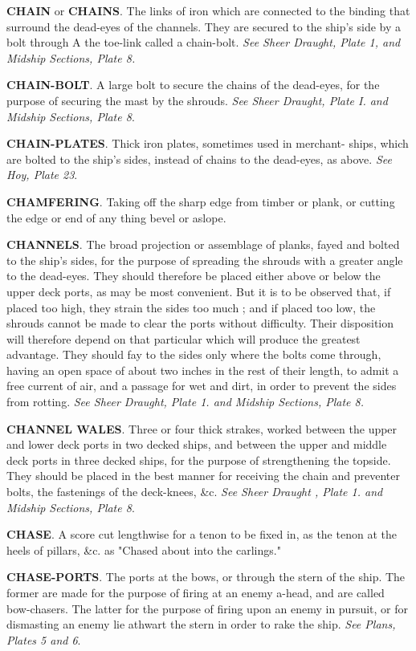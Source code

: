 \textbf{CHAIN} or \textbf{CHAINS}. The links of iron which are connected to the binding that surround the dead-eyes of the channels. They are secured to the ship's side by a bolt through A the toe-link called a chain-bolt. \textit{See Sheer Draught, Plate 1, and Midship Sections, Plate 8. }

\textbf{CHAIN-BOLT}. A large bolt to secure the chains of the dead-eyes, for the purpose of securing the mast by the shrouds. \textit{See Sheer Draught, Plate I. and Midship Sections, Plate 8}. 

\textbf{CHAIN-PLATES}. Thick iron plates, sometimes used in merchant- ships, which are bolted to the ship's sides, instead of chains to the dead-eyes, as above. \textit{See Hoy, Plate 23}. 

\textbf{CHAMFERING}. Taking off the sharp edge from timber or plank, or cutting the edge or end of any thing bevel or aslope. 

\textbf{CHANNELS}. The broad projection or assemblage of planks, fayed and bolted to the ship's sides, for the purpose of spreading the shrouds with a greater angle to the dead-eyes. They should therefore be placed either above or below the upper deck ports, as may be most convenient. But it is to be observed that, if placed too high, they strain the sides too much ; and if placed too low, the shrouds cannot be made to clear the ports without difficulty. Their disposition will therefore depend on that particular which will produce the greatest advantage. They should fay to the sides only where the bolts come through, having an open space of about two inches in the rest of their length, to admit a free current of air, and a passage for wet and dirt, in order to prevent the sides from rotting. \textit{See Sheer Draught, Plate 1. and Midship Sections, Plate 8.} 

\textbf{CHANNEL WALES}. Three or four thick strakes, worked between the upper and lower deck ports in two decked ships, and between the upper and middle deck ports in three decked ships, for the purpose of strengthening the topside. They should be placed in the best manner for receiving the chain and preventer bolts, the fastenings of the deck-knees, \&c. \textit{See Sheer Draught , Plate 1. and Midship Sections, Plate 8}.

\textbf{CHASE}. A score cut lengthwise for a tenon to be fixed in, as the tenon at the heels of pillars, \&c. as "Chased about into the carlings."

\textbf{CHASE-PORTS}. The ports at the bows, or through the stern of the ship. The former are made for the purpose of firing at an enemy a-head, and are called bow-chasers. The latter for the purpose of firing upon an enemy in pursuit, or for dismasting an enemy lie athwart the stern in order to rake the ship. \textit{See Plans, Plates 5 and 6}. 

